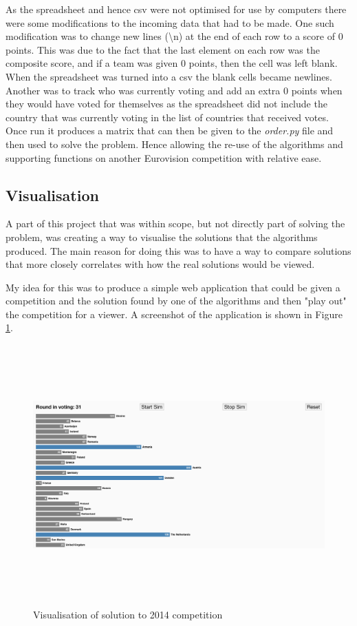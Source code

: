 \documentclass[12pt]{report}
\begin{document}
As the spreadsheet and hence csv were not optimised for use by computers there were some modifications to the incoming data that had to be made. One such modification was to change new lines (\textbackslash n) at the end of each row to a score of 0 points. This was due to the fact that the last element on each row was the composite score, and if a team was given 0 points, then the cell was left blank. When the spreadsheet was turned into a csv the blank cells became newlines. Another was to track who was currently voting and add an extra 0 points when they would have voted for themselves as the spreadsheet did not include the country that was currently voting in the list of countries that received votes. Once run it produces a matrix that can then be given to the \textit{order.py} file and then used to solve the problem. Hence allowing the re-use of the algorithms and supporting functions on another Eurovision competition with relative ease.

\subsection{Visualisation}\label{Imp-Vis}
A part of this project that was within scope, but not directly part of solving the problem, was creating a way to visualise the solutions that the algorithms produced. The main reason for doing this was to have a way to compare solutions that more closely correlates with how the real solutions would be viewed.

My idea for this was to produce a simple web application that could be given a competition and the solution found by one of the algorithms and then "play out" the competition for a viewer. A screenshot of the application is shown in Figure \ref{visScreenshot}.

\begin{figure}[H]
\centering
\includegraphics[width=17cm, height=10cm]{./visualisation}
\caption{Visualisation of solution to 2014 competition}
\label{visScreenshot}
\end{figure}
\end{document}
